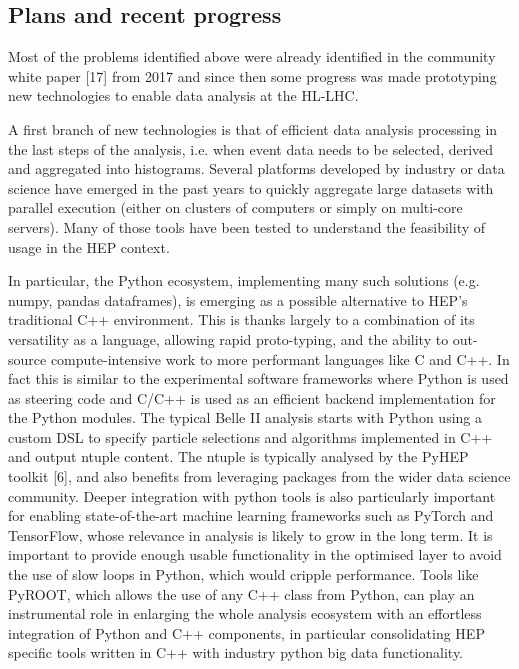 \documentclass[10pt,a4paper]{article}
\begin{document}
\hypertarget{plans-and-recent-progress}{%
\subsection{Plans and recent progress}\label{plans-and-recent-progress}}

Most of the problems identified above were already identified in the
community white paper {[}17{]} from 2017 and since then some progress
was made prototyping new technologies to enable data analysis at the
HL-LHC.

A first branch of new technologies is that of efficient data analysis
processing in the last steps of the analysis, i.e. when event data needs
to be selected, derived and aggregated into histograms. Several
platforms developed by industry or data science have emerged in the past
years to quickly aggregate large datasets with parallel execution
(either on clusters of computers or simply on multi-core servers). Many
of those tools have been tested to understand the feasibility of usage
in the HEP context.

In particular, the Python ecosystem, implementing many such solutions
(e.g. numpy, pandas dataframes), is emerging as a possible alternative
to HEP's traditional C++ environment. This is thanks largely to a
combination of its versatility as a language, allowing rapid
proto-typing, and the ability to out-source compute-intensive work to
more performant languages like C and C++. In fact this is similar to the
experimental software frameworks where Python is used as steering code
and C/C++ is used as an efficient backend implementation for the Python
modules. The typical Belle II analysis starts with Python using a custom
DSL to specify particle selections and algorithms implemented in C++ and
output ntuple content. The ntuple is typically analysed by the PyHEP
toolkit {[}6{]}, and also benefits from leveraging packages from the
wider data science community. Deeper integration with python tools is
also particularly important for enabling state-of-the-art machine
learning frameworks such as PyTorch and TensorFlow, whose relevance in
analysis is likely to grow in the long term. It is important to provide
enough usable functionality in the optimised layer to avoid the use of
slow loops in Python, which would cripple performance. Tools like
PyROOT, which allows the use of any C++ class from Python, can play an
instrumental role in enlarging the whole analysis ecosystem with an
effortless integration of Python and C++ components, in particular
consolidating HEP specific tools written in C++ with industry python big
data functionality.
\end{document}
